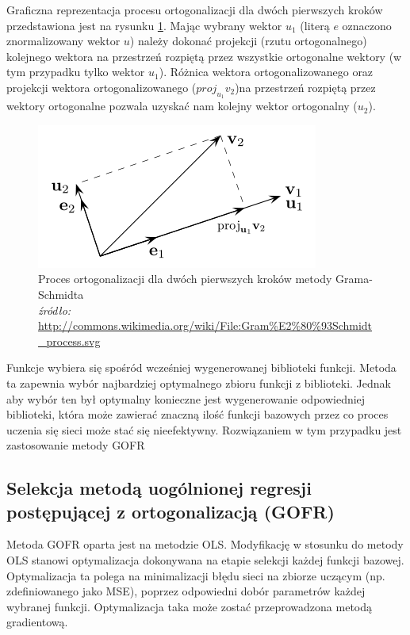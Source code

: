 Graficzna reprezentacja procesu ortogonalizacji dla dwóch pierwszych kroków przedstawiona jest na rysunku \ref{fig:gram}. Mając wybrany wektor $u_1$ (literą $e$ oznaczono znormalizowany wektor $u$) należy dokonać projekcji (rzutu ortogonalnego) kolejnego wektora na przestrzeń rozpiętą przez wszystkie ortogonalne wektory (w tym przypadku tylko wektor $u_1$). Różnica wektora ortogonalizowanego oraz projekcji wektora ortogonalizowanego ($proj_{u_1}v_2$)na przestrzeń rozpiętą przez wektory ortogonalne pozwala uzyskać nam kolejny wektor ortogonalny ($u_2$).
\begin{figure}[ht!]
	\centering
	
	\includegraphics[scale=0.7]{images/GramSchmidt.png}
	\caption{Proces ortogonalizacji dla dwóch pierwszych kroków metody Grama-Schmidta \\
	\footnotesize {\textit{źródło:} \url{http://commons.wikimedia.org/wiki/File:Gram\%E2\%80\%93Schmidt\_process.svg}}}
	\label{fig:gram}	

\end{figure}

Funkcje wybiera się spośród wcześniej wygenerowanej biblioteki funkcji. Metoda ta zapewnia wybór najbardziej optymalnego zbioru funkcji z biblioteki. Jednak aby wybór ten był optymalny konieczne jest wygenerowanie odpowiedniej biblioteki, która może zawierać znaczną ilość funkcji bazowych przez co proces uczenia się sieci może stać się nieefektywny. Rozwiązaniem w tym przypadku jest zastosowanie metody GOFR

\subsection{Selekcja metodą uogólnionej regresji postępującej z ortogonalizacją (GOFR)}
Metoda GOFR oparta jest na metodzie OLS\cite{Duboisa}. Modyfikację w stosunku do metody OLS stanowi optymalizacja dokonywana na etapie selekcji każdej funkcji bazowej. Optymalizacja ta polega na minimalizacji błędu sieci na zbiorze uczącym (np. zdefiniowanego jako MSE), poprzez odpowiedni dobór parametrów każdej wybranej funkcji. Optymalizacja taka może zostać przeprowadzona metodą gradientową.


